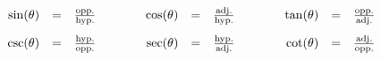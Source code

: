 \begin{eqnarray*}
  \begin{array}{rcl@{\hspace{4em}}rcl@{\hspace{4em}}rcl}
    \sin(\theta) & = & \frac{\textrm{opp.}}{\textrm{hyp.}} & 
    \cos(\theta) & = & \frac{\textrm{adj.}}{\textrm{hyp.}} &
    \tan(\theta) & = & \frac{\textrm{opp.}}{\textrm{adj.}} \\ [10pt]
    \csc(\theta) & = & \frac{\textrm{hyp.}}{\textrm{opp.}} & 
    \sec(\theta) & = & \frac{\textrm{hyp.}}{\textrm{adj.}} &
    \cot(\theta) & = & \frac{\textrm{adj.}}{\textrm{opp.}} 
  \end{array}
\end{eqnarray*}

\newpage





